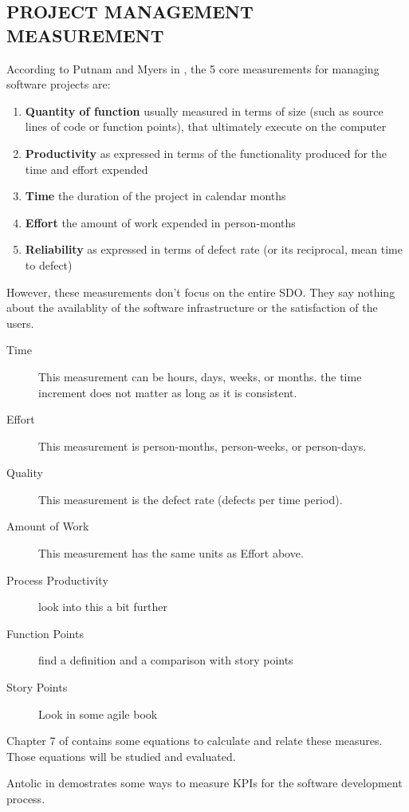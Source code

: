 \documentclass[SDSUThesis.tex]{subfiles}
\begin{document}
\subsection{PROJECT MANAGEMENT MEASUREMENT}
According to Putnam and Myers in \cite{Putnam2013}, the 5 core measurements for managing software
projects are:

\begin{enumerate}
    \item \textbf{Quantity of function} usually measured in terms of size (such as source lines of code or function points), that ultimately execute on the computer
    \item \textbf{Productivity} as expressed in terms of the functionality produced for the time and effort expended
    \item \textbf{Time} the duration of the project in calendar months
    \item \textbf{Effort} the amount of work expended in person-months
    \item \textbf{Reliability} as expressed in terms of defect rate (or its reciprocal, mean time to defect)
\end{enumerate}
However, these measurements don't focus on the entire SDO. They say nothing about the availablity of the software infrastructure or the satisfaction of the users.

\begin{description}
  \item[Time] This measurement can be hours, days, weeks, or months.  the time increment does not matter as long as it is consistent.
  \item[Effort] This measurement is person-months, person-weeks, or person-days.
  \item[Quality] This measurement is the defect rate (defects per time period).
  \item[Amount of Work] This measurement has the same units as Effort above. 
  \item[Process Productivity] look into this a bit further
  \item[Function Points] find a definition and a comparison with story points
  \item[Story Points] Look in some agile book
\end{description}

Chapter 7 of \cite{Putnam2013} contains some equations to calculate and relate
these measures. Those equations will be studied and evaluated.

Antolic in \cite{Antolic2008} demostrates some ways to measure KPIs for the  software development process.
\end{document}

